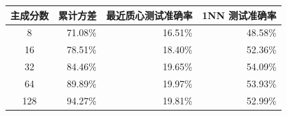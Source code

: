 \begin{tabular}{crrr}
\toprule
主成分数 & 累计方差 & 最近质心测试准确率 & 1NN 测试准确率 \\
\midrule
8 & 71.08\% & 16.51\% & 48.58\% \\
16 & 78.51\% & 18.40\% & 52.36\% \\
32 & 84.46\% & 19.65\% & 54.09\% \\
64 & 89.89\% & 19.97\% & 53.93\% \\
128 & 94.27\% & 19.81\% & 52.99\% \\
\bottomrule
\end{tabular}
